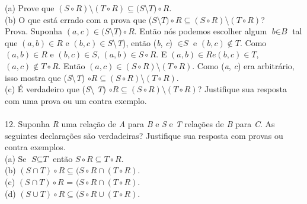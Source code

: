 (a) Prove que $(\textit{S} \circ \textit{R})$\textbackslash$(\textit{T} \circ \textit{R}) \subseteq (\textit{S}$\textbackslash $\textit{T}) \circ \textit{R}$.
\\

(b) O que está errado com a prova que ($\textit{S}$\textbackslash$\textit{T}) \circ \textit{R} \subseteq (\textit{S} \circ \textit{R})$\textbackslash$(\textit{T} \circ \textit{R})$? 
\\
Prova. Suponha $(\textit{a}, \textit{c}) \in (\textit{S}$\textbackslash$\textit{T}) \circ \textit{R}$. Então nós podemos escolher algum $\textit{b} \in \textit{B}$ tal que $(\textit{a}, \textit{b}) \in \textit{R}$ e $(\textit{b}, \textit{c}) \in \textit{S}$\textbackslash\textit{T}), então (\textit{b}, \textit{c}) $\in \textit{S}$ e $(\textit{b}, \textit{c}) \not\in \textit{T}$. Como $(\textit{a}, \textit{b}) \in \textit{R}$ e $(\textit{b}, \textit{c}) \in \textit{S}$,  $(\textit{a}, \textit{b}) \in \textit{S} \circ \textit{R}$. E $(\textit{a}, \textit{b}) \in \textit{R} e (\textit{b}, \textit{c}) \in \textit{T}$, $(\textit{a}, \textit{c}) \not\in \textit{T} \circ \textit{R}$. Então $(\textit{a}, \textit{c}) \in (\textit{S} \circ \textit{R})$\textbackslash$(\textit{T} \circ \textit{R})$. Como (\textit{a}, \textit{c}) era arbitrário, isso mostra que (\textit{S}\textbackslash\textit{T}) $\circ \textit{R} \subseteq (\textit{S} \circ \textit{R})$\textbackslash$(\textit{T} \circ \textit{R})$.
\\

(c) É verdadeiro que (\textit{S}\textbackslash
\textit{T}) $\circ \textit{R} \subseteq (\textit{S} \circ \textit{R})$\textbackslash$(\textit{T} \circ \textit{R})$? Justifique sua resposta com uma prova ou um contra exemplo.
\\
\\
12. Suponha \textit{R} uma relação de \textit{A} para \textit{B} e \textit{S} e \textit{T} relações de \textit{B} para \textit{C}. As seguintes declarações são verdadeiras? Justifique sua resposta com provas ou contra exemplos.
\\

(a) Se $\textit{S} \subseteq \textit{T}$ então $\textit{S} \circ \textit{R} \subseteq \textit{T} \circ \textit{R}$.
\\

(b) $(\textit{S} \cap \textit{T}) \circ \textit{R} \subseteq (\textit{S} \circ \textit{R} \cap (\textit{T} \circ \textit{R})$.
\\

(c) $(\textit{S} \cap \textit{T}) \circ \textit{R}$ = $(\textit{S} \circ \textit{R} \cap (\textit{T} \circ \textit{R})$.
\\

(d) $(\textit{S} \cup \textit{T}) \circ \textit{R} \subseteq (\textit{S} \circ \textit{R} \cup (\textit{T} \circ \textit{R})$.

